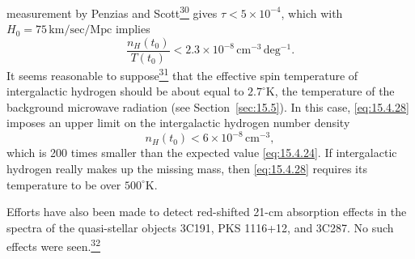 measurement by Penzias and Scott\hyperref[ch15-ref-30]{\textsuperscript{30}}
gives \(\tau<5\times10^{-4}\), which with
\(H_0=75\,\mathrm{km/sec/Mpc}\) implies
\begin{equation}
  \frac{n_H(t_0)}{T(t_0)}
  <
  2.3\times10^{-8}\,\mathrm{cm^{-3}\,deg^{-1}}.
  \tag{15.4.28}\label{eq:15.4.28}
\end{equation}
It seems reasonable to suppose\hyperref[ch15-ref-31]{\textsuperscript{31}}
that the effective spin temperature of intergalactic hydrogen should be about
equal to \(2.7^\circ\mathrm{K}\), the temperature of the background microwave
radiation (see Section~\ref{sec:15.5}). In this case, \eqref{eq:15.4.28}
imposes an upper limit on the intergalactic hydrogen number density
\begin{equation}
  n_H(t_0)<6\times10^{-8}\,\mathrm{cm^{-3}},
  \tag{15.4.29}\label{eq:15.4.29}
\end{equation}
which is 200 times smaller than the expected value \eqref{eq:15.4.24}. If
intergalactic hydrogen really makes up the missing mass, then
\eqref{eq:15.4.28} requires its temperature to be over
\(500^\circ\mathrm{K}\).

Efforts have also been made to detect red-shifted 21-cm absorption effects in
the spectra of the quasi-stellar objects 3C191, PKS 1116+12, and 3C287. No such
effects were seen.\hyperref[ch15-ref-32]{\textsuperscript{32}}

